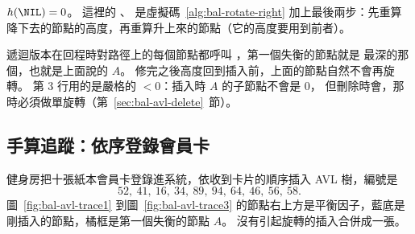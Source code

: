 $h(\NIL) = 0$。 這裡的 、 是虛擬碼~\ref{alg:bal-rotate-right}
加上最後兩步：先重算降下去的節點的高度，再重算升上來的節點（它的高度要用到前者）。

遞迴版本在回程時對路徑上的每個節點都呼叫 ，第一個失衡的節點就是
最深的那個，也就是上面說的 $A$。 修完之後高度回到插入前，上面的節點自然不會再旋
轉。  第 3 行用的是嚴格的 $< 0$：插入時 $A$ 的子節點不會是 $0$，
但刪除時會，那時必須做單旋轉（第~\ref{sec:bal-avl-delete}~節）。

\subsection{手算追蹤：依序登錄會員卡}
\label{sec:bal-avl-trace}

健身房把十張紙本會員卡登錄進系統，依收到卡片的順序插入 AVL 樹，編號是
\[
52,\ 41,\ 16,\ 34,\ 89,\ 94,\ 64,\ 46,\ 56,\ 58 .
\]
圖~\ref{fig:bal-avl-trace1} 到圖~\ref{fig:bal-avl-trace3} 的節點右上方是平衡因子，藍底是剛插入的節點，橘框是第一個失衡的節點
$A$。 沒有引起旋轉的插入合併成一張。

